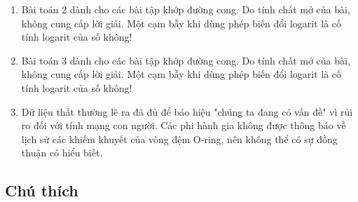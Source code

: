 \begin{enumerate}
\begin{enumerate}
    Vế trái của bất đẳng thức là thống kê Chi-square quan sát được, tính từ dữ liệu. Vế phải là giá trị của biến Chi-square ứng với xác suất C, tức là giá trị của tích phân hàm mật độ đến biến ngẫu nhiên đó; các giá trị này đã được lập bảng.

    Với bài toán đang xét: \(\chi^2_{0.95,19} = 30{,}1\) và \(\chi_0^2 = 422\).

    Do đó, giả thuyết được chấp nhận: dữ liệu không tương quan tuyến tính.
  \item
    Với kiểm định Kolmogorov-Smirnov, ta dùng cùng giả thuyết: \(H_0\): dữ liệu không tương quan.

    Ta bác bỏ giả thuyết nếu: \(\sup\{|y_f - y_d|\} \ge d_\alpha(\nu)\)

    Chỉ số dưới của y lần lượt là giá trị "khớp" (fitted) và giá trị "dữ liệu" (data). Như vậy, với một cặp dữ liệu \(x_d, y_d\), giá trị của hàm khớp tại \(x_d\) là \(y_f\). Giá trị lớn nhất ("supremum") được so sánh với thống kê K-S ứng với mức ý nghĩa và số bậc tự do như ở bài (d).

    Ta có \(\sup\{|y_f - y_d|\} = 45\) và \(d_{0.05}(19) = 0{,}301\), nên không thể bác bỏ giả thuyết rằng dữ liệu không tương quan tuyến tính.
  \end{enumerate}
\item
  Bài toán 2 dành cho các bài tập khớp đường cong. Do tính chất mở của bài, không cung cấp lời giải. Một cạm bẫy khi dùng phép biến đổi logarit là cố tính logarit của số không!
\item
  Bài toán 3 dành cho các bài tập khớp đường cong. Do tính chất mở của bài, không cung cấp lời giải. Một cạm bẫy khi dùng phép biến đổi logarit là cố tính logarit của số không!
\item
  Dữ liệu thất thường lẽ ra đã đủ để báo hiệu "chúng ta đang có vấn đề" vì rủi ro đối với tính mạng con người. Các phi hành gia không được thông báo về lịch sử các khiếm khuyết của vòng đệm O-ring, nên không thể có sự đồng thuận có hiểu biết.
\end{enumerate}

\subsection{Chú thích}

